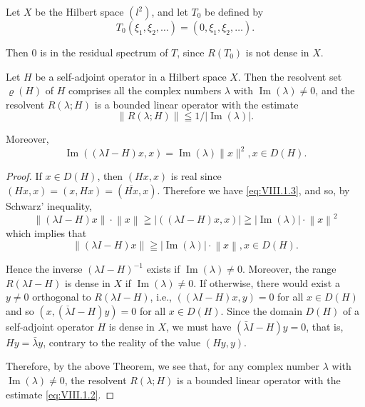 \begin{example}\label{ex:VIII.1.Example.3} Let $X$ be the Hilbert space $(l^2)$, and let $T_0$ be defined by 
\[
T _{0} (\xi_{1}, \xi_{2}, \dots) = (0, \xi_{1}, \xi_{2}, \dots).
\]
\end{example}

Then $0$ is in the residual spectrum of $T$, since $R(T_0)$ is not dense in $X$. 

\begin{example}\label{ex:VIII.1.Example.4} Let $H$ be a self-adjoint operator in a Hilbert space $X$. Then the resolvent set $\varrho(H)$ of $H$ comprises all the complex numbers $\lambda$ with $\operatorname{Im}(\lambda) \neq 0$, and the resolvent $R(\lambda; H)$ is a bounded linear operator with the estimate 
\begin{equation}\label{eq:VIII.1.2}
\left\| R (\lambda ; H) \right\| \leqq 1 / \left| \operatorname{Im} (\lambda) \right|.
\end{equation}
\end{example}

Moreover, 
\begin{equation}\label{eq:VIII.1.3}
\operatorname{Im} \left((\lambda I - H) x, x\right) = \operatorname{Im} (\lambda) \| x \| ^{2}, x \in D (H).
\end{equation}

\begin{proof}
 If $x \in D(H)$, then $(Hx, x)$ is real since $(Hx, x) = (x, Hx) = (\overline{Hx}, x)$. Therefore we have \eqref{eq:VIII.1.3}, and so, by Schwarz' inequality, 
\begin{equation}\label{eq:VIII.1.4}
\left\| (\lambda I - H) x \right\| \cdot \left\| x \right\| \geqq \left| ((\lambda I - H) x, x) \right| \geqq \left| \operatorname{Im} (\lambda) \right| \cdot \left\| x \right\| ^{2}
\end{equation}
which implies that 
\begin{equation}\label{eq:VIII.1.5}
\left\| (\lambda I - H) x \right\| \geqq \left| \operatorname{Im} (\lambda) \right| \cdot \left\| x \right\|, x \in D (H). \end{equation}

Hence the inverse $(\lambda I-H)^{-1}$ exists if $\operatorname{Im}(\lambda) \neq 0$. Moreover, the range $R(\lambda I-H)$ is dense in $X$ if $\operatorname{Im}(\lambda) \neq 0$. If otherwise, there would exist a $y \neq 0$ orthogonal to $R(\lambda I-H)$, i.e., $((\lambda I-H)x,y)=0$ for all $x \in D(H)$ and so $(x,(\overline{\lambda}I-H)y)=0$ for all $x \in D(H)$. Since the domain $D(H)$ of a self-adjoint operator $H$ is dense in $X$, we must have $(\bar{\lambda} I - H)y = 0$, that is, $Hy = \bar{\lambda} y$, contrary to the reality of the value $(Hy, y)$. 

Therefore, by the above Theorem, we see that, for any complex number $\lambda$ with $\operatorname{Im}(\lambda) \neq 0$, the resolvent $R(\lambda; H)$ is a bounded linear operator with the estimate \eqref{eq:VIII.1.2}. 
\end{proof}


